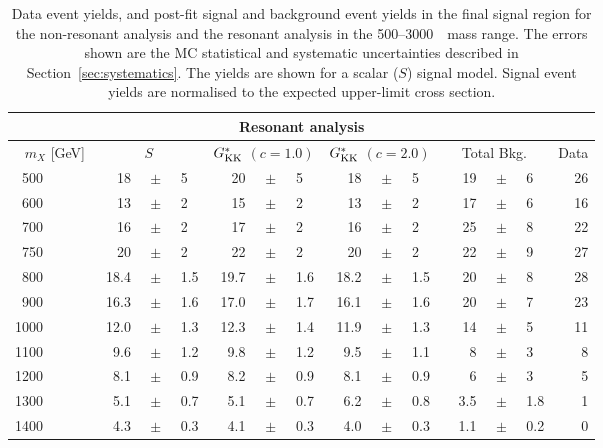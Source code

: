  
\begin{table}
\caption{Data event yields, and post-fit signal and background event yields in the final signal region for the non-resonant analysis and the resonant analysis in the 500--3000~\GeV\ mass range. The errors shown
are the MC statistical and systematic uncertainties described in
Section~\ref{sec:systematics}. The yields are shown for a scalar ($S$) signal model. Signal event yields are normalised to the expected upper-limit cross section.}  
\label{tab:event_yields_low}
\small
\begin{center}
\begin{tabular}{r|*{4}{r@{}c@{}l|}r}
\hline
\multicolumn{14}{c}{Resonant analysis} \\
\hline
$m_X$ [GeV] & \multicolumn{3}{c}{$S$} & \multicolumn{3}{c}{$G^{\ast}_{\rm KK}$ $(c=1.0)$} & \multicolumn{3}{c}{$G^{\ast}_{\rm KK}$ $(c=2.0)$} & \multicolumn{3}{c}{Total Bkg.} & Data \\
\hline
500~~~~~~& 18&$\,\pm\,$&5 & 20&$\,\pm\,$&5 & 18&$\,\pm\,$&5 & 19&$\,\pm\,$&6 & 26 \\
600~~~~~~& 13&$\,\pm\,$&2 & 15&$\,\pm\,$&2 & 13&$\,\pm\,$&2 & 17&$\,\pm\,$&6 & 16 \\
700~~~~~~& 16&$\,\pm\,$&2 & 17&$\,\pm\,$&2 & 16&$\,\pm\,$&2 & 25&$\,\pm\,$&8 & 22 \\
750~~~~~~& 20&$\,\pm\,$&2 & 22&$\,\pm\,$&2 & 20&$\,\pm\,$&2 & 22&$\,\pm\,$&9 & 27 \\
800~~~~~~& 18.4&$\,\pm\,$&1.5 & 19.7&$\,\pm\,$&1.6 & 18.2&$\,\pm\,$&1.5 & 20&$\,\pm\,$&8 & 28  \\
900~~~~~~& 16.3&$\,\pm\,$&1.6 & 17.0&$\,\pm\,$&1.7 & 16.1&$\,\pm\,$&1.6 & 20&$\,\pm\,$&7 &
                                                                     23
 \\
1000~~~~~~& 12.0&$\,\pm\,$&1.3 & 12.3&$\,\pm\,$&1.4 & 11.9&$\,\pm\,$&1.3 & 14&$\,\pm\,$&5 &
                                                                      11
 \\
1100~~~~~~& ~~9.6&$\,\pm\,$&1.2 & ~~9.8&$\,\pm\,$&1.2 & ~~9.5&$\,\pm\,$&1.1 & ~~8&$\,\pm\,$&3 & 8
 \\
1200~~~~~~& ~~8.1&$\,\pm\,$&0.9 & ~~8.2&$\,\pm\,$&0.9 & ~~8.1&$\,\pm\,$&0.9 & ~~6&$\,\pm\,$&3 & 5
 \\
1300~~~~~~& ~~5.1&$\,\pm\,$&0.7 & ~~5.1&$\,\pm\,$&0.7 & ~~6.2&$\,\pm\,$&0.8 & ~~3.5&$\,\pm\,$&1.8 &
                                                                      1
 \\
1400~~~~~~& 4.3&$\,\pm\,$&0.3 & 4.1&$\,\pm\,$&0.3 & 4.0&$\,\pm\,$&0.3 & ~~1.1&$\,\pm\,$&0.2 & 0 \\

\end{tabular}
\end{center}
\end{table}
